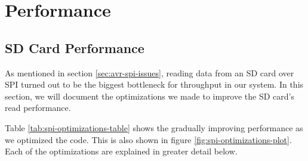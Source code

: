\section{Performance}

\subsection{SD Card Performance}
\label{sec:performance-sd-card}

As mentioned in section \ref{sec:avr-spi-issues}, reading data from an
SD card over SPI turned out to be the biggest bottleneck for throughput
in our system. In this section, we will document the optimizations we
made to improve the SD card's read performance.

Table \ref{tab:spi-optimizations-table} shows the gradually improving
performance as we optimized the code. This is also shown in figure
\ref{fig:spi-optimizations-plot}. Each of the optimizations are
explained in greater detail below.

